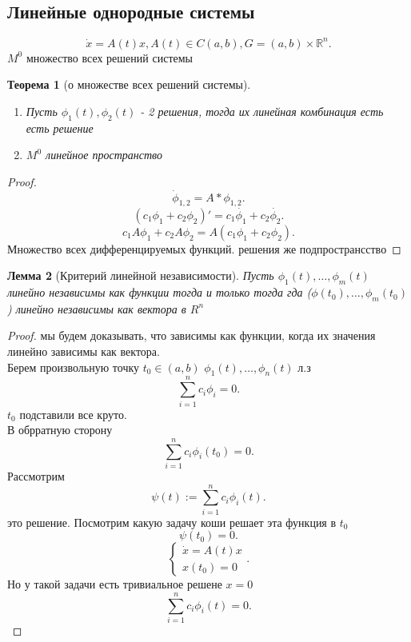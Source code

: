 \documentclass[14pt]{extarticle}
\newtheorem{theorem}{Теорема}
\newtheorem{lemma}[theorem]{Лемма}
\begin{document}
 \subsection{Линейные однородные системы}
 \[
     \dot{x} = A(t) x,  A(t) \in C(a,b), G = (a,b) \times \mathbb{R}^{n}
 .\] 
 $M^{0}$ множество всех решений системы
 \begin{theorem}[о множестве всех решений системы]
     \begin{enumerate}
         \item Пусть $\phi_1(t) , \phi_{2}(t)$ - 2 решения, тогда их линейная комбинация есть есть решение
            \item $M^{0}$ линейное пространство
     \end{enumerate}
 \end{theorem}
 \begin{proof}
     \[
         \dot{\phi}_{1,2} = A * \phi_{1,2}
     .\] 
     \[
         (c_1 \phi_1 + c_2 \phi_2)' = c_1 \dot{\phi_{1}} + c_2 \dot{\phi_{2}} 
     .\] 
     \[
     c_1 A \phi_1 + c_2 A \phi_2 = A(c_1\phi_1 + c_2 \phi_2)
     .\] 
     Множество всех дифференцируемых функций. решения же подпространсство
\end{proof}
\begin{lemma}[Критерий линейной независимости]
    Пусть $\phi_1(t) , \dots, \phi_{m}(t)$ линейно независимы как функции тогда и только тогда гда
    ($\phi(t_0),\dots,\phi_{m}(t_0)$) линейно независимы как вектора в $R^{n}$
\end{lemma}
\begin{proof}
    мы будем доказывать, что зависимы как функции, когда их значения линейно зависимы как вектора.
    \\
    Берем произвольную точку $t_0 \in (a,b)$ $\phi_1(t),\dots,\phi_{n}(t)$ л.з
    \[
    \sum_{i =1}^{n} c_{i} \phi_{i} = 0
    .\] 
    $t_0$ подставили все круто.\\
    В обрратную сторону
    \[
    \sum_{i = 1}^{n} c_{i} \phi_{i}(t_0) = 0
    .\] 
    Рассмотрим 
    \[
    \psi(t) := \sum_{i = 1}^{n} c_{i} \phi_{i}(t)
    .\] 
    это решение. Посмотрим какую задачу коши решает эта функция в $t_0$
    \[
    \psi(t_0) = 0
    .\] 
    \[
    \begin{cases}
        \dot{x}  = A(t)x\\
        x(t_0) = 0
    \end{cases}
    .\] 
    Но у такой задачи есть тривиальное решене $x = 0$
     \[
    \sum_{i =1}^{n} c_{i} \phi_{i}(t) = 0
.\]
\end{proof}
\end{document}
